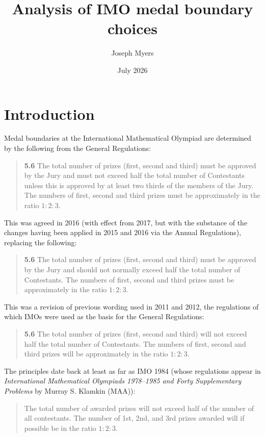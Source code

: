 \documentclass[a4paper,10pt]{article}
\begin{document}
\title{Analysis of IMO medal boundary choices}
\author{Joseph Myers}
\date{July 2026}
\maketitle

\section*{Introduction}

Medal boundaries at the International Mathematical Olympiad are
determined by the following from the General Regulations:

\begin{quote}
\textbf{5.6} The total number of prizes (first, second and third) must
be approved by the Jury and must not exceed half the total number of
Contestants unless this is approved by at least two thirds of the
members of the Jury. The numbers of first, second and third prizes
must be approximately in the ratio $1:2:3$.
\end{quote}

This was agreed in 2016 (with effect from 2017, but with the substance
of the changes having been applied in 2015 and 2016 via the Annual
Regulations), replacing the following:

\begin{quote}
\textbf{5.6} The total number of prizes (first, second and third) must
be approved by the Jury and should not normally exceed half the total
number of Contestants. The numbers of first, second and third prizes
must be approximately in the ratio $1:2:3$.
\end{quote}

This was a revision of previous wording used in 2011 and 2012, the
regulations of which IMOs were used as the basis for the General
Regulations:

\begin{quote}
\textbf{5.6} The total number of prizes (first, second and third) will
not exceed half the total number of Contestants. The numbers of first,
second and third prizes will be approximately in the ratio $1:2:3$.
\end{quote}

The principles date back at least as far as IMO 1984 (whose
regulations appear in \textit{International Mathematical Olympiads
  1978--1985 and Forty Supplementary Problems} by Murray S. Klamkin
(MAA)):

\begin{quote}
The total number of awarded prizes will not exceed half of the number
of all contestants.  The number of 1st, 2nd, and 3rd prizes awarded
will if possible be in the ratio $1:2:3$.
\end{quote}
\end{document}
